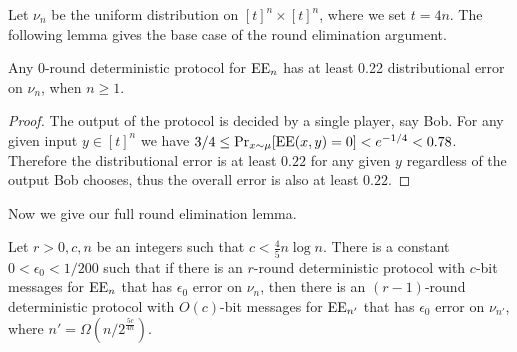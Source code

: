 Let $\nu_n$ be the uniform distribution on $[t]^n\times [t]^n$,
where we set $t=4n$. The following lemma gives the base case of
the round elimination argument.
\begin{lemma}\label{lem:terminal} 
Any 0-round deterministic protocol for $\operatorname{EE}_n$ has at least 0.22
distributional error on $\nu_n$, when $n\geq 1$.
\end{lemma}
\begin{proof}
The output of the protocol is decided by a single player, say
Bob. For any given input $y\in[t]^n$ we have $3/4
\leq\Pr_{x\sim\mu}[\operatorname{EE}(x,y)=0] < e^{-1/4} < 0.78$. Therefore the
distributional error is at least $0.22$ for any given $y$
regardless of the output Bob chooses, thus the overall error is
also at least $0.22$.
\end{proof}
Now we give our full round elimination lemma.
\begin{lemma}\label{lem:roundel} 
Let $r>0, c ,n$ be an integers such that $c < \frac{4}{5}n\log n$.
There is a constant $0<\epsilon_0<1/200$ such that if there is
an $r$-round deterministic protocol with $c$-bit messages for
$\operatorname{EE}_n$ that has $\epsilon_0$ error on $\nu_n$, then there is an
$(r-1)$-round deterministic protocol with $O(c)$-bit messages
for $\operatorname{EE}_{n'}$ that has $\epsilon_0$ error on $\nu_{n'}$, where
$n' = \Omega(n/2^\frac{5c}{4n})$.
\end{lemma}
